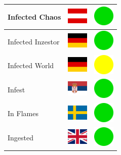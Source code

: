 \documentclass[12pt, a4paper, twoside]{report}
\begin{document}
\begin{center}
\begin{longtable}{|p{5cm}|p{2cm}|p{2cm}|}
Infected Chaos & \includegraphics[width=1cm]{4x3/at} & \includegraphics[width=1cm]{likes/y} \\ \hline
Infected Inzestor & \includegraphics[width=1cm]{4x3/de} & \includegraphics[width=1cm]{likes/y} \\ \hline
Infected World & \includegraphics[width=1cm]{4x3/de} & \includegraphics[width=1cm]{likes/m} \\ \hline
Infest & \includegraphics[width=1cm]{4x3/rs} & \includegraphics[width=1cm]{likes/y} \\ \hline
In Flames & \includegraphics[width=1cm]{4x3/se} & \includegraphics[width=1cm]{likes/y} \\ \hline
Ingested & \includegraphics[width=1cm]{4x3/gb} & \includegraphics[width=1cm]{likes/y} \\ \hline

\end{longtable}
\end{center}
\end{document}
